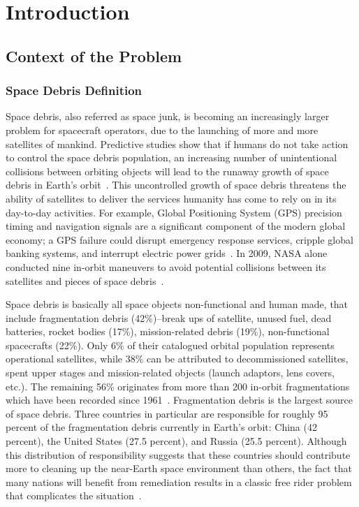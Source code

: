 \documentclass{mcmthesis}
\begin{document}
\tableofcontents

\newpage

\section{Introduction}
	
\subsection{Context of the Problem}
	
\subsubsection{Space Debris Definition}
	
	Space debris, also referred as space junk, is becoming an increasingly larger problem for spacecraft operators, due to the launching of more and more satellites of mankind. Predictive studies show that if humans do not take action to control the space debris population, an increasing number of unintentional collisions between orbiting objects will lead to the runaway growth of space debris in Earth's orbit~\cite{Liou}. This uncontrolled growth of space debris threatens the ability of satellites to deliver the services humanity has come to rely on in its day-to-day activities. For example, Global Positioning System (GPS) precision timing and navigation signals are a significant component of the modern global economy; a GPS failure could disrupt emergency response services, cripple global banking systems, and interrupt electric power grids~\cite{Logsdon}. In 2009, NASA alone conducted nine in-orbit maneuvers to avoid potential collisions between its satellites and pieces of space debris~\cite{Megan}.
	
	Space debris is basically all space objects non-functional and human made, that include fragmentation debris (42\%)--break ups of satellite, unused fuel, dead batteries, rocket bodies (17\%), mission-related debris (19\%), non-functional spacecrafts (22\%). Only 6\% of their catalogued orbital population represents operational satellites, while 38\% can be attributed to decommissioned satellites, spent upper stages and mission-related objects (launch adaptors, lens covers, etc.). The remaining 56\% originates from more than 200 in-orbit fragmentations which have been recorded since 1961~\cite{Karishma}. Fragmentation debris is the largest source of space debris. Three countries in particular are responsible for roughly 95 percent of the fragmentation debris currently in Earth's orbit: China (42 percent), the United States (27.5 percent), and Russia (25.5 percent). Although this distribution of responsibility suggests that these countries should contribute more to cleaning up the near-Earth space environment than others, the fact that many nations will benefit from remediation results in a classic free rider problem that complicates the situation~\cite{Megan}.
	
\end{document}
